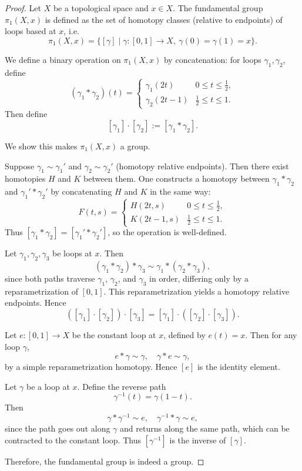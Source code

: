 \begin{proof}

Let $X$ be a topological space and $x \in X$. The fundamental group $\pi_1(X,x)$ is defined as the set of homotopy classes (relative to endpoints) of loops based at $x$, i.e.
$$
\pi_1(X,x) = \{ [\gamma] \mid \gamma : [0,1] \to X, \ \gamma(0)=\gamma(1)=x \}.
$$

We define a binary operation on $\pi_1(X,x)$ by concatenation:
for loops $\gamma_1, \gamma_2$, define
$$
(\gamma_1 * \gamma_2)(t) =
\begin{cases}
\gamma_1(2t) & 0 \le t \le \tfrac{1}{2}, \\
\gamma_2(2t - 1) & \tfrac{1}{2} \le t \le 1.
\end{cases}
$$
Then define
$$
[\gamma_1] \cdot [\gamma_2] := [\gamma_1 * \gamma_2].
$$

We show this makes $\pi_1(X,x)$ a group.




Suppose $\gamma_1 \sim \gamma_1'$ and $\gamma_2 \sim \gamma_2'$ (homotopy relative endpoints). Then there exist homotopies $H$ and $K$ between them. One constructs a homotopy between $\gamma_1 * \gamma_2$ and $\gamma_1' * \gamma_2'$ by concatenating $H$ and $K$ in the same way:
$$
F(t,s) =
\begin{cases}
H(2t,s) & 0 \le t \le \tfrac{1}{2}, \\
K(2t-1,s) & \tfrac{1}{2} \le t \le 1.
\end{cases}
$$
Thus $[\gamma_1 * \gamma_2] = [\gamma_1' * \gamma_2']$, so the operation is well-defined.

Let $\gamma_1, \gamma_2, \gamma_3$ be loops at $x$. Then
$$
(\gamma_1 * \gamma_2) * \gamma_3 \sim \gamma_1 * (\gamma_2 * \gamma_3),
$$
since both paths traverse $\gamma_1$, $\gamma_2$, and $\gamma_3$ in order, differing only by a reparametrization of $[0,1]$. This reparametrization yields a homotopy relative endpoints. Hence
$$
([\gamma_1] \cdot [\gamma_2]) \cdot [\gamma_3]
= [\gamma_1] \cdot ([\gamma_2] \cdot [\gamma_3]).
$$


Let $e : [0,1] \to X$ be the constant loop at $x$, defined by $e(t)=x$. Then for any loop $\gamma$,
$$
e * \gamma \sim \gamma, \quad \gamma * e \sim \gamma,
$$
by a simple reparametrization homotopy. Hence $[e]$ is the identity element.


Let $\gamma$ be a loop at $x$. Define the reverse path
$$
\gamma^{-1}(t) = \gamma(1 - t).
$$
Then
$$
\gamma * \gamma^{-1} \sim e, \quad \gamma^{-1} * \gamma \sim e,
$$
since the path goes out along $\gamma$ and returns along the same path, which can be contracted to the constant loop. Thus $[\gamma^{-1}]$ is the inverse of $[\gamma]$.

Therefore, the fundamental group is indeed a group.
\end{proof}

